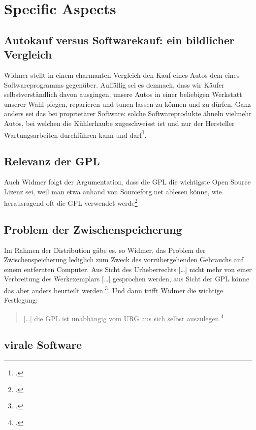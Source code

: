 \documentclass[DIV=calc,BCOR=5mm,11pt,headings=small,oneside,abstract=true, toc=bib]{scrartcl}
\begin{document}
\section{Specific Aspects}

\subsection{Autokauf versus Softwarekauf: ein bildlicher Vergleich}

Widmer stellt in einem charmanten Vergleich den Kauf eines Autos dem eines
Softwareprogramms gegenüber. Auffällig sei es demnach, dass wir Käufer
selbstverständlich davon ausgingen, unsere Autos in einer beliebigen Werkstatt
unserer Wahl pfegen, reparieren und tunen lassen zu können und zu dürfen. Ganz
anders sei das bei proprietärer Software: \glqq{}solche Softwareprodukte
ähneln vielmehr Autos, bei welchen die Kühlerhaube zugeschweisst ist und
nur der Hersteller Wartungsarbeiten durchführen kann und
darf\grqq{}\footcite[vgl.][1]{Widmer2003a}.

\subsection{Relevanz der GPL}
Auch Widmer folgt der Argumentation, dass die GPL die wichtigste Open Source
Lizenz sei, weil man etwa anhand von Sourceforg.net ablesen könne, wie
herausragend oft die GPL verwendet werde\footcite[vgl.][102]{Widmer2003a}

\subsection{Problem der Zwischenspeicherung}
Im Rahmen der Distribution gäbe es, so Widmer, das Problem der
Zwischenspeicherung \glqq{}lediglich zum Zweck des vorrübergehenden
Gebrauchs auf einem entfernten Computer\grqq{}.
Aus Sicht des Urheberrechts \glqq{}[\ldots] nicht mehr von einer
Verbreitung des Werkexemplars [\ldots] gesprochen werden\grqq{}, aus Sicht der
GPL könne das aber anders beurteilt werden.\footcite[vgl.][119]{Widmer2003a}.
Und dann trifft Widmer die wichtige Festlegung:
\begin{quote} \glqq{} [\ldots] die GPL ist unabhängig vom URG aus sich
selbst auszulegen.\grqq{}\footcite[][119]{Widmer2003a}
\end{quote}

\subsection{virale Software}
\end{document}
